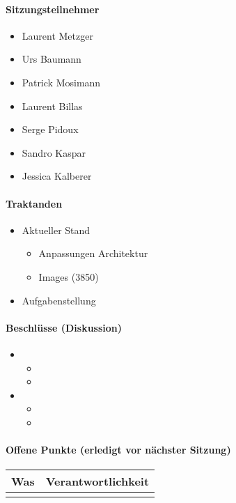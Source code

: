 \paragraph{Sitzungsteilnehmer}
\begin{itemize}	
	\item Laurent Metzger 
	\item Urs Baumann 
	\item Patrick Mosimann
	\item Laurent Billas
	\item Serge Pidoux
	\item Sandro Kaspar
	\item Jessica Kalberer
\end{itemize}

\paragraph{Traktanden}
\begin{itemize}	
	\item Aktueller Stand 
	\begin{itemize}
		\item Anpassungen Architektur
		\item Images (3850)
	\end{itemize}
	\item Aufgabenstellung	
\end{itemize}

\paragraph{Beschlüsse (Diskussion)}
\begin{itemize}	
	\item 
	\begin{itemize}
		\item 
		\item 
	\end{itemize}
	\item 
	\begin{itemize}
		\item 
		\item 
	\end{itemize} 
\end{itemize}

\paragraph{Offene Punkte (erledigt vor nächster Sitzung)} \mbox{}
\begin{table}[H]
	\centering
	\begin{tabularx}{\textwidth}{X | p{4.5cm}}
		\rowcolor{gray!50}
		\textbf{Was} & \textbf{Verantwortlichkeit} \\
		\hline	
		 &  \\
	\end{tabularx}
	\label{tab:my-label}
\end{table}

